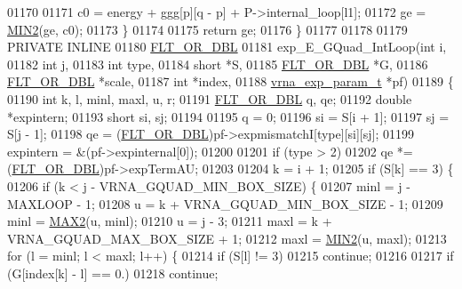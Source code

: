 \begin{DoxyCode}
01170 
01171       c0  = energy + ggg[p][q - p] + P->internal\_loop[l1];
01172       ge  = \hyperlink{group__utils_gae0b9cd0ce090bd69b951aa73e8fa4f7d}{MIN2}(ge, c0);
01173     \}
01174 
01175   \textcolor{keywordflow}{return} ge;
01176 \}
01177 
01178 
01179 PRIVATE INLINE
01180 \hyperlink{group__data__structures_ga31125aeace516926bf7f251f759b6126}{FLT\_OR\_DBL}
01181 exp\_E\_GQuad\_IntLoop(\textcolor{keywordtype}{int}               i,
01182                     \textcolor{keywordtype}{int}               j,
01183                     \textcolor{keywordtype}{int}               type,
01184                     \textcolor{keywordtype}{short}             *S,
01185                     \hyperlink{group__data__structures_ga31125aeace516926bf7f251f759b6126}{FLT\_OR\_DBL}        *G,
01186                     \hyperlink{group__data__structures_ga31125aeace516926bf7f251f759b6126}{FLT\_OR\_DBL}        *scale,
01187                     \textcolor{keywordtype}{int}               *index,
01188                     \hyperlink{group__energy__parameters_structvrna__exp__param__s}{vrna\_exp\_param\_t}  *pf)
01189 \{
01190   \textcolor{keywordtype}{int}         k, l, minl, maxl, u, r;
01191   \hyperlink{group__data__structures_ga31125aeace516926bf7f251f759b6126}{FLT\_OR\_DBL}  q, qe;
01192   \textcolor{keywordtype}{double}      *expintern;
01193   \textcolor{keywordtype}{short}       si, sj;
01194 
01195   q         = 0;
01196   si        = S[i + 1];
01197   sj        = S[j - 1];
01198   qe        = (\hyperlink{group__data__structures_ga31125aeace516926bf7f251f759b6126}{FLT\_OR\_DBL})pf->expmismatchI[type][si][sj];
01199   expintern = &(pf->expinternal[0]);
01200 
01201   \textcolor{keywordflow}{if} (type > 2)
01202     qe *= (\hyperlink{group__data__structures_ga31125aeace516926bf7f251f759b6126}{FLT\_OR\_DBL})pf->expTermAU;
01203 
01204   k = i + 1;
01205   if (S[k] == 3) \{
01206     \textcolor{keywordflow}{if} (k < j - VRNA\_GQUAD\_MIN\_BOX\_SIZE) \{
01207       minl  = j - MAXLOOP - 1;
01208       u     = k + VRNA\_GQUAD\_MIN\_BOX\_SIZE - 1;
01209       minl  = \hyperlink{group__utils_ga33297b3679c713b0c4d897cd0fe3b122}{MAX2}(u, minl);
01210       u     = j - 3;
01211       maxl  = k + VRNA\_GQUAD\_MAX\_BOX\_SIZE + 1;
01212       maxl  = \hyperlink{group__utils_gae0b9cd0ce090bd69b951aa73e8fa4f7d}{MIN2}(u, maxl);
01213       \textcolor{keywordflow}{for} (l = minl; l < maxl; l++) \{
01214         \textcolor{keywordflow}{if} (S[l] != 3)
01215           \textcolor{keywordflow}{continue};
01216 
01217         \textcolor{keywordflow}{if} (G[index[k] - l] == 0.)
01218           \textcolor{keywordflow}{continue};

\end{DoxyCode}
